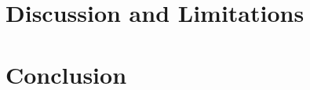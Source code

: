 \documentclass[9pt]{ieeeconf}
\begin{document}
\section{Discussion and Limitations}
\label{sec:discussion}

\section{Conclusion}
\label{sec:conclusion}

\begin{acknowledgments}
\end{acknowledgments}


\nocite{*}

\end{document}
